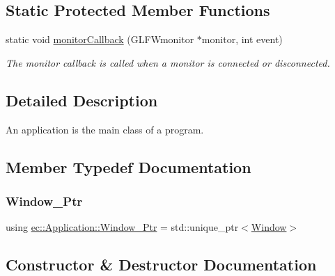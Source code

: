 \subsection*{Static Protected Member Functions}
\begin{DoxyCompactItemize}
\item 
static void \mbox{\hyperlink{classec_1_1_application_adaeb3f63d8e850d7b83f1c1b61bc73d1}{monitor\+Callback}} (G\+L\+F\+Wmonitor $\ast$monitor, int event)
\begin{DoxyCompactList}\small\item\em The monitor callback is called when a monitor is connected or disconnected. \end{DoxyCompactList}\end{DoxyCompactItemize}


\subsection{Detailed Description}
An application is the main class of a program. 

\subsection{Member Typedef Documentation}
\mbox{\label{classec_1_1_application_af1e09a0f1b603eab8d3245d8b8075ad5}} 
\subsubsection{\texorpdfstring{Window\+\_\+\+Ptr}{Window\_Ptr}}
{\footnotesize\ttfamily using \mbox{\hyperlink{classec_1_1_application_af1e09a0f1b603eab8d3245d8b8075ad5}{ec\+::\+Application\+::\+Window\+\_\+\+Ptr}} =  std\+::unique\+\_\+ptr$<$\mbox{\hyperlink{classec_1_1_window}{Window}}$>$}



\subsection{Constructor \& Destructor Documentation}
\mbox{\label{classec_1_1_application_af2a7b16d775fbce44dc0035fb96513f3}} 
